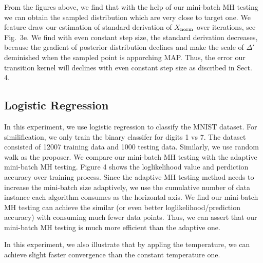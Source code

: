 \documentclass{article}
\begin{document}
From the figures above, we find that with the help of our mini-batch MH testing we can obtain the
sampled distribution which are very close to target one. We feature draw our estimation of standard
derivation of $X_{\rm norm}$ over iterations, see Fig.~3e. We find with even constant step size, the
standard derivation decreases, because the gradient of posterior distribution declines and make the
scale of $\Delta'$ deminished when the sampled point is apporching MAP. Thus, the error our
transition kernel will declines with even constant step size as discribed in Sect.~ 4.

\subsection{Logistic Regression}\label{ssec:logistic}

In this experiment, we use logistic regression to classify the MNIST dataset. For similification, we
only train the binary classifer for digits 1 vs 7. The dataset consisted of 12007 training data and
1000 testing data. Similarly, we use random walk as the proposer. We compare our mini-batch MH
testing with the adaptive mini-batch MH testing. Figure 4 shows the loglikelihood value and
perdiction accuracy over training process. Since the adaptive MH testing method needs to increase
the mini-batch size adaptively, we use the cumulative number of data instance each algorithm
consumes as the horizontal axis. We find our mini-batch MH testing can achieve the similar (or even
better loglikelihood/prediction accuracy) with consuming much fewer data points. Thus, we can assert
that our mini-batch MH testing is much more efficient than the adaptive one. 

In this experiment, we also illustrate that by appling the temperature, we can achieve slight faster convergence than the constant temperature one.
\end{document}
